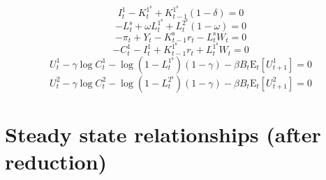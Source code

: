 \begin{equation}
I^{\mathrm{1}}_{t} - K^{\mathrm{1}^{\mathrm{s}}}_{t} + {K^{\mathrm{1}^{\mathrm{s}}}_{t-1}} \left(1 - \delta\right) = 0
\end{equation}
\begin{equation}
-L^{\mathrm{s}}_{t} + {\omega} {L^{\mathrm{1}^{\mathrm{s}}}_{t}} + {L^{\mathrm{2}^{\mathrm{s}}}_{t}} \left(1 - \omega\right) = 0
\end{equation}
\begin{equation}
-\pi_{t} + Y_{t} - {K^{\mathrm{s}}_{t-1}} {r_{t}} - {L^{\mathrm{s}}_{t}} {W_{t}} = 0
\end{equation}
\begin{equation}
-C^{\mathrm{1}}_{t} - I^{\mathrm{1}}_{t} + {K^{\mathrm{1}^{\mathrm{s}}}_{t-1}} {r_{t}} + {L^{\mathrm{1}^{\mathrm{s}}}_{t}} {W_{t}} = 0
\end{equation}
\begin{equation}
U^{\mathrm{1}}_{t} - {\gamma} {\log{C^{\mathrm{1}}_{t}}} - {\log\left(1 - L^{\mathrm{1}^{\mathrm{s}}}_{t}\right)} \left(1 - \gamma\right) - {\beta} {B_{t}} {\mathrm{E}_{t}\left[U^{\mathrm{1}}_{t+1}\right]} = 0
\end{equation}
\begin{equation}
U^{\mathrm{2}}_{t} - {\gamma} {\log{C^{\mathrm{2}}_{t}}} - {\log\left(1 - L^{\mathrm{2}^{\mathrm{s}}}_{t}\right)} \left(1 - \gamma\right) - {\beta} {B_{t}} {\mathrm{E}_{t}\left[U^{\mathrm{2}}_{t+1}\right]} = 0
\end{equation}



\section{Steady state relationships (after reduction)}

